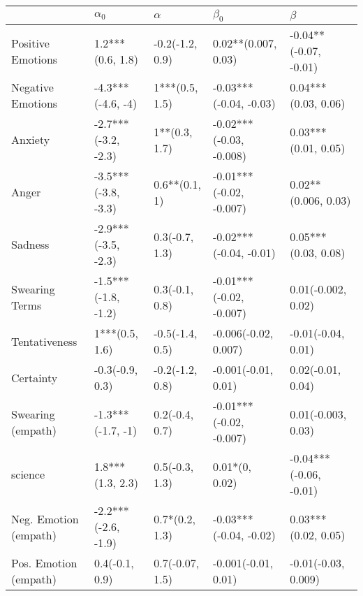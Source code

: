 \begin{tabular}{lllll}
\toprule
{} &           $\alpha_0$ &         $\alpha$ &                $\beta_0$ &                 $\beta$ \\
\midrule
Positive Emotions     &     1.2***(0.6, 1.8) &  -0.2(-1.2, 0.9) &      0.02**(0.007, 0.03) &   -0.04**(-0.07, -0.01) \\
Negative Emotions     &    -4.3***(-4.6, -4) &   1***(0.5, 1.5) &   -0.03***(-0.04, -0.03) &     0.04***(0.03, 0.06) \\
Anxiety               &  -2.7***(-3.2, -2.3) &    1**(0.3, 1.7) &  -0.02***(-0.03, -0.008) &     0.03***(0.01, 0.05) \\
Anger                 &  -3.5***(-3.8, -3.3) &    0.6**(0.1, 1) &  -0.01***(-0.02, -0.007) &     0.02**(0.006, 0.03) \\
Sadness               &  -2.9***(-3.5, -2.3) &   0.3(-0.7, 1.3) &   -0.02***(-0.04, -0.01) &     0.05***(0.03, 0.08) \\
Swearing Terms        &  -1.5***(-1.8, -1.2) &   0.3(-0.1, 0.8) &  -0.01***(-0.02, -0.007) &      0.01(-0.002, 0.02) \\
Tentativeness         &       1***(0.5, 1.6) &  -0.5(-1.4, 0.5) &     -0.006(-0.02, 0.007) &      -0.01(-0.04, 0.01) \\
Certainty             &      -0.3(-0.9, 0.3) &  -0.2(-1.2, 0.8) &      -0.001(-0.01, 0.01) &       0.02(-0.01, 0.04) \\
Swearing (empath)     &    -1.3***(-1.7, -1) &   0.2(-0.4, 0.7) &  -0.01***(-0.02, -0.007) &      0.01(-0.003, 0.03) \\
science               &     1.8***(1.3, 2.3) &   0.5(-0.3, 1.3) &           0.01*(0, 0.02) &  -0.04***(-0.06, -0.01) \\
Neg. Emotion (empath) &  -2.2***(-2.6, -1.9) &   0.7*(0.2, 1.3) &   -0.03***(-0.04, -0.02) &     0.03***(0.02, 0.05) \\
Pos. Emotion (empath) &       0.4(-0.1, 0.9) &  0.7(-0.07, 1.5) &      -0.001(-0.01, 0.01) &     -0.01(-0.03, 0.009) \\
\bottomrule
\end{tabular}
